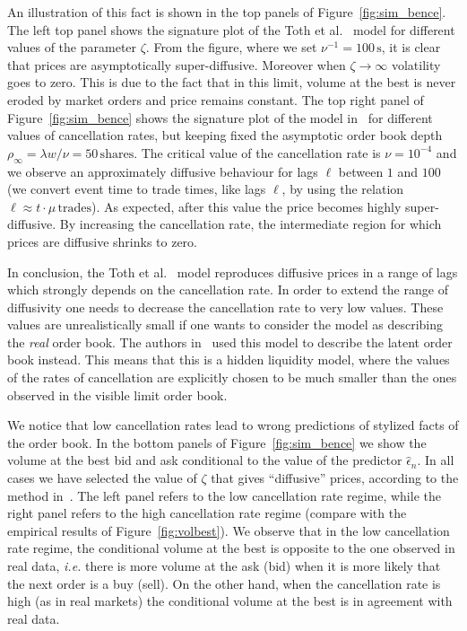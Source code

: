 \documentclass[12pt]{iopart}
\begin{document}
An illustration of this fact is shown in the top panels of Figure~\ref{fig:sim_bence}. The left top panel shows the signature plot of the Toth et al.~\cite{toth2011anomalous} model for different values of the parameter $\zeta$. From the figure, where we set $\nu^{-1}=100\,\mathrm{s}$, it is clear that prices are asymptotically super-diffusive. Moreover when $\zeta\to \infty$ volatility goes to zero. This is due to the fact that in this limit, volume at the best is never eroded by market orders and price remains constant. The top right panel of Figure~\ref{fig:sim_bence} shows the signature plot of the model in~\cite{toth2011anomalous} for different values of cancellation rates, but keeping fixed the asymptotic order book depth $\rho_\infty=\lambda w/\nu=50\,\mathrm{shares}$. The critical value of the cancellation rate is $\nu=10^{-4}$ and we observe an approximately diffusive behaviour for lags $\ell$ between $1$ and $100$ (we convert event time to trade times, like lags $\ell$, by using the relation $\ell \approx t\cdot\mu\,\mathrm{trades}$). As expected, after this value the price becomes highly super-diffusive. By increasing the cancellation rate, the intermediate region for which prices are diffusive shrinks to zero.

In conclusion, the Toth et al.~\cite{toth2011anomalous} model reproduces diffusive prices in a range of lags which strongly depends on the cancellation rate. In order to extend the range of diffusivity one needs to decrease the cancellation rate to very low values. These values are unrealistically small if one wants to consider the model as describing the \textit{real} order book. The authors in~\cite{toth2011anomalous} used this model to describe the latent order book instead. This means that this is a hidden liquidity model, where the values of the rates of cancellation are explicitly chosen to be much smaller than the ones observed in the visible limit order book. 
 

We notice that low cancellation rates lead to wrong predictions of stylized facts of the order book. In the bottom panels of Figure~\ref{fig:sim_bence} we show the volume at the best bid and ask conditional to the value of the predictor $\hat\epsilon_n$. In all cases we have selected the value of $\zeta$ that gives “diffusive” prices, according to the method in~\cite{toth2011anomalous}. The left panel refers to the low cancellation rate regime, while the right panel refers to the high cancellation rate regime (compare with the empirical results of Figure~\ref{fig:volbest}). We observe that in the low cancellation rate regime, the conditional volume at the best is opposite to the one observed in real data, \textit{i.e.} there is more volume at the ask (bid) when it is more likely that the next order is a buy (sell). On the other hand, when the cancellation rate is high (as in real markets) the conditional volume at the best is in agreement with real data. 
\end{document}
